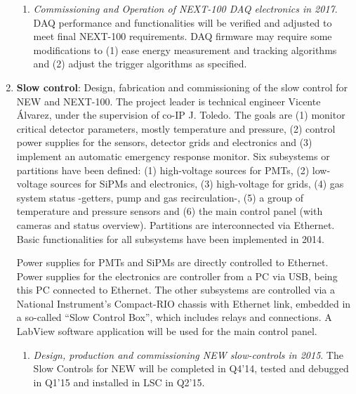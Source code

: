 \begin{enumerate}
\begin{enumerate}
\item	{\em Commissioning and Operation of NEXT-100 DAQ electronics in 2017}. DAQ performance and functionalities will be verified and adjusted to meet final NEXT-100 requirements. DAQ firmware may require some modifications to (1) ease energy measurement and tracking algorithms and (2) adjust the trigger algorithms as specified.


\end{enumerate}

\item {\bf Slow control}: Design, fabrication and commissioning of the slow control for NEW and NEXT-100. The project leader is technical engineer Vicente Álvarez, under the supervision of co-IP J. Toledo. The goals are (1) monitor critical detector parameters, mostly temperature and pressure, (2) control power supplies for the sensors, detector grids and electronics and (3) implement an automatic emergency response monitor.
Six subsystems or partitions have been defined: (1) high-voltage sources for PMTs, (2) low-voltage sources for SiPMs and electronics, (3) high-voltage for grids, (4) gas system status -getters, pump and gas recirculation-, (5) a group of temperature and pressure sensors and (6) the main control panel (with cameras and status overview). Partitions are interconnected via Ethernet. Basic functionalities for all subsystems have been implemented in 2014.

Power supplies for PMTs and SiPMs are directly controlled to Ethernet. Power supplies for the electronics are controller from a PC via USB, being this PC connected to Ethernet. The other subsystems are controlled via a National Instrument’s Compact-RIO chassis with Ethernet link, embedded in a so-called “Slow Control Box”, which includes relays and connections. A LabView software application will be used for the main control panel.

\begin{enumerate}
\item {\em Design, production and commissioning NEW slow-controls in 2015}. The Slow Controls for NEW will be completed in Q4’14, tested and debugged in  Q1’15 and installed in LSC in Q2’15.


\end{enumerate}
\end{enumerate}
